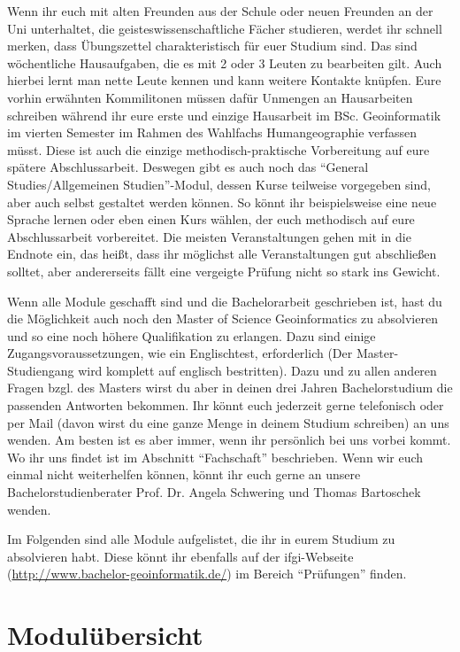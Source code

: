 Wenn ihr euch mit alten Freunden aus der Schule oder neuen Freunden an der Uni unterhaltet, die geisteswissenschaftliche Fächer studieren, werdet ihr schnell merken, dass Übungszettel charakteristisch für euer Studium sind. Das sind wöchentliche Hausaufgaben, die es mit 2 oder 3 Leuten zu bearbeiten gilt. Auch hierbei lernt man nette Leute kennen und kann weitere Kontakte knüpfen. Eure vorhin erwähnten Kommilitonen müssen dafür Unmengen an Hausarbeiten schreiben während ihr eure erste und einzige Hausarbeit im BSc. Geoinformatik im vierten Semester im Rahmen des Wahlfachs Humangeographie verfassen müsst. Diese ist auch die einzige methodisch-praktische Vorbereitung auf eure spätere Abschlussarbeit. Deswegen gibt es auch noch das "`General Studies/Allgemeinen Studien"'-Modul, dessen Kurse teilweise vorgegeben sind, aber auch selbst gestaltet werden können. So könnt ihr beispielsweise eine neue Sprache lernen oder eben einen Kurs wählen, der euch methodisch auf eure Abschlussarbeit vorbereitet. Die meisten Veranstaltungen gehen mit in die Endnote ein, das heißt, dass ihr möglichst alle Veranstaltungen gut abschließen solltet, aber andererseits fällt eine vergeigte Prüfung nicht so stark ins Gewicht.

Wenn alle Module geschafft sind und die Bachelorarbeit geschrieben ist, hast du die Möglichkeit auch noch den Master of Science Geoinformatics zu absolvieren und so eine noch höhere Qualifikation zu erlangen. Dazu sind einige Zugangsvoraussetzungen, wie ein Englischtest, erforderlich (Der Master-Studiengang wird komplett auf englisch bestritten). Dazu und zu allen anderen Fragen bzgl. des Masters wirst du aber in deinen drei Jahren Bachelorstudium die passenden Antworten bekommen. Ihr könnt euch jederzeit gerne telefonisch oder per Mail (davon wirst du eine ganze Menge in deinem Studium schreiben) an uns wenden. Am besten ist es aber immer, wenn ihr persönlich bei uns vorbei kommt. Wo ihr uns findet ist im Abschnitt "`Fachschaft"' beschrieben. Wenn wir euch einmal nicht weiterhelfen können, könnt ihr euch gerne an unsere Bachelorstudienberater Prof. Dr. Angela Schwering und Thomas Bartoschek wenden.

Im Folgenden sind alle Module aufgelistet, die ihr in eurem Studium zu absolvieren habt. Diese könnt ihr ebenfalls auf der ifgi-Webseite (\url{http://www.bachelor-geoinformatik.de/}) im Bereich "`Prüfungen"' ﬁnden.

\newpage

\section{Modulübersicht}

